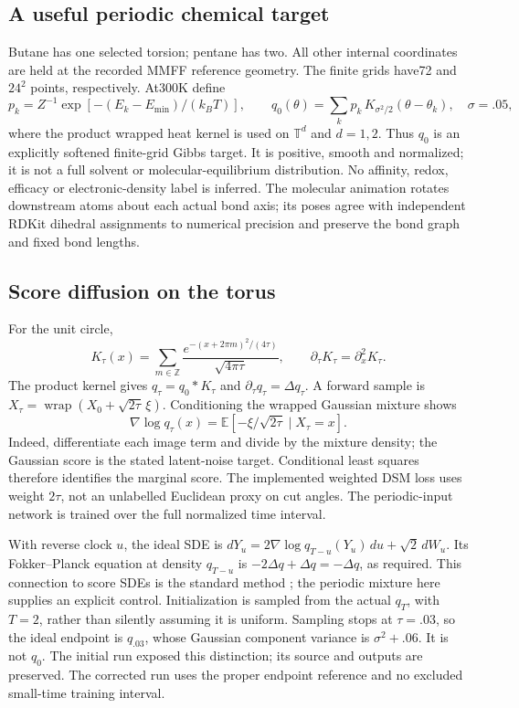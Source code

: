 \documentclass[11pt,oneside,openany]{book}
\theoremstyle{definition}\newtheorem{definition}[theorem]{Definition}
\theoremstyle{remark}\newtheorem{remark}[theorem]{Remark}
\begin{document}
\subsection{A useful periodic chemical target}
Butane has one selected torsion; pentane has two. All other internal coordinates
are held at the recorded MMFF reference geometry. The finite grids have72 and
$24^2$ points, respectively. At300K define
\[
 p_k=Z^{-1}\exp[-(E_k-E_{\min})/(k_BT)],\qquad
 q_0(\theta)=\sum_k p_k\,K_{\sigma^2/2}(\theta-\theta_k),\quad \sigma=.05,
\]
where the product wrapped heat kernel is used on $\mathbb T^d$ and $d=1,2$.
Thus $q_0$ is an explicitly softened finite-grid Gibbs target. It is positive,
smooth and normalized; it is not a full solvent or molecular-equilibrium
distribution. No affinity, redox, efficacy or electronic-density label is inferred.
The molecular animation rotates downstream atoms about each actual bond axis;
its poses agree with independent RDKit dihedral assignments to numerical
precision and preserve the bond graph and fixed bond lengths.

\subsection{Score diffusion on the torus}
For the unit circle,
\[
 K_\tau(x)=\sum_{m\in\mathbb Z}\frac{e^{-(x+2\pi m)^2/(4\tau)}}{\sqrt{4\pi\tau}},
 \qquad \partial_\tau K_\tau=\partial_x^2K_\tau.
\]
The product kernel gives $q_\tau=q_0*K_\tau$ and
$\partial_\tau q_\tau=\Delta q_\tau$. A forward sample is
$X_\tau=\operatorname{wrap}(X_0+\sqrt{2\tau}\,\xi)$.
Conditioning the wrapped Gaussian mixture shows
\[
 \nabla\log q_\tau(x)
 =\mathbb E[-\xi/\sqrt{2\tau}\mid X_\tau=x].
\]
Indeed, differentiate each image term and divide by the mixture density;
the Gaussian score is the stated latent-noise target. Conditional least
squares therefore identifies the marginal score. The implemented weighted
DSM loss uses weight $2\tau$, not an unlabelled Euclidean proxy on cut angles.
The periodic-input network is trained over the full normalized time interval.

With reverse clock $u$, the ideal SDE is
$dY_u=2\nabla\log q_{T-u}(Y_u)\,du+\sqrt2\,dW_u$.
Its Fokker--Planck equation at density $q_{T-u}$ is
$-2\Delta q+\Delta q=-\Delta q$, as required. This connection to score SDEs
is the standard method \cite{VisScore}; the periodic mixture here supplies an
explicit control. Initialization is sampled from the actual $q_T$, with $T=2$,
rather than silently assuming it is uniform. Sampling stops at $\tau=.03$,
so the ideal endpoint is $q_{.03}$, whose Gaussian component variance is
$\sigma^2+.06$. It is not $q_0$. The initial run exposed this distinction;
its source and outputs are preserved. The corrected run uses the proper endpoint
reference and no excluded small-time training interval.
\end{document}
